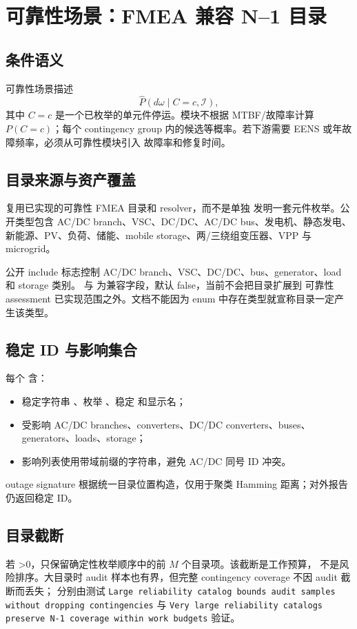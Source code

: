 \section{可靠性场景：FMEA 兼容 N--1 目录}
\label{sec:reliability-scenarios}

\subsection{条件语义}
可靠性场景描述
\begin{equation}
 \widehat P(d\omega\mid C=c,\mathcal I),
\end{equation}
其中 $C=c$ 是一个已枚举的单元件停运。模块不根据 MTBF/故障率计算 $P(C=c)$；每个
contingency group 内的候选等概率。若下游需要 EENS 或年故障频率，必须从可靠性模块引入
故障率和修复时间。

\subsection{目录来源与资产覆盖}
 复用已实现的可靠性 FMEA 目录和 resolver，而不是单独
发明一套元件枚举。公开类型包含 AC/DC branch、VSC、DC/DC、AC/DC bus、发电机、静态发电、
新能源、PV、负荷、储能、mobile storage、两/三绕组变压器、VPP 与 microgrid。

公开 include 标志控制 AC/DC branch、VSC、DC/DC、bus、generator、load 和 storage 类别。
 与  为兼容字段，默认 false，当前不会把目录扩展到
可靠性 assessment 已实现范围之外。文档不能因为 enum 中存在类型就宣称目录一定产生该类型。

\subsection{稳定 ID 与影响集合}
每个  含：
\begin{itemize}
  \item 稳定字符串 、枚举 、稳定  和显示名；
  \item 受影响 AC/DC branches、converters、DC/DC converters、buses、generators、loads、storage；
  \item 影响列表使用带域前缀的字符串，避免 AC/DC 同号 ID 冲突。
\end{itemize}
outage signature 根据统一目录位置构造，仅用于聚类 Hamming 距离；对外报告仍返回稳定 ID。

\subsection{目录截断}
若 >0，只保留确定性枚举顺序中的前 $M$ 个目录项。该截断是工作预算，
不是风险排序。大目录时 audit 样本也有界，但完整 contingency coverage 不因 audit 截断而丢失；
分别由测试
\texttt{Large reliability catalog bounds audit samples without dropping contingencies} 与
\texttt{Very large reliability catalogs preserve N-1 coverage within work budgets} 验证。

